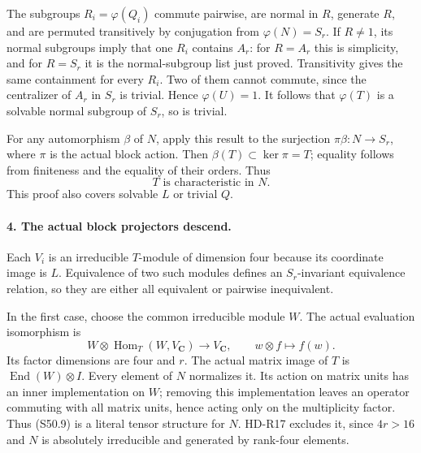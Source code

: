 The subgroups \(R_i=\varphi(Q_i)\) commute pairwise,
are normal in \(R\), generate \(R\), and are permuted
transitively by conjugation from \(\varphi(N)=S_r\).
If \(R\ne1\), its normal subgroups imply that one
\(R_i\) contains \(A_r\): for \(R=A_r\) this is
simplicity, and for \(R=S_r\) it is the normal-subgroup
list just proved. Transitivity gives the same containment
for every \(R_i\). Two of them cannot commute, since the
centralizer of \(A_r\) in \(S_r\) is trivial. Hence
\(\varphi(U)=1\). It follows that \(\varphi(T)\)
is a solvable normal subgroup of \(S_r\), so is trivial.

For any automorphism \(\beta\) of \(N\), apply this
result to the surjection \(\pi\beta:N\to S_r\), where
\(\pi\) is the actual block action. Then
\(\beta(T)\subset\ker\pi=T\); equality follows from
finiteness and the equality of their orders. Thus
\[
                              T\text{ is characteristic in }N.
                                                               \tag{S50.8}
\]
This proof also covers solvable \(L\) or trivial \(Q\).

\paragraph{4. The actual block projectors descend.}
Each \(V_i\) is an irreducible \(T\)-module of dimension
four because its coordinate image is \(L\). Equivalence
of two such modules defines an \(S_r\)-invariant
equivalence relation, so they are either all equivalent or
pairwise inequivalent.

In the first case, choose the common irreducible module \(W\).
The actual evaluation isomorphism is
\[
 W\otimes\operatorname{Hom}_T(W,V_{\mathbf C})
        \longrightarrow V_{\mathbf C},\qquad
                  w\otimes f\longmapsto f(w).
                                                               \tag{S50.9}
\]
Its factor dimensions are four and \(r\). The actual
matrix image of \(T\) is \(\operatorname{End}(W)\otimes I\).
Every element of \(N\) normalizes it. Its action on matrix
units has an inner implementation on \(W\); removing
this implementation leaves an operator commuting with all
matrix units, hence acting only on the multiplicity factor.
Thus (S50.9) is a literal tensor structure for \(N\).
HD-R17 excludes it, since \(4r>16\) and \(N\) is
absolutely irreducible and generated by rank-four elements.

